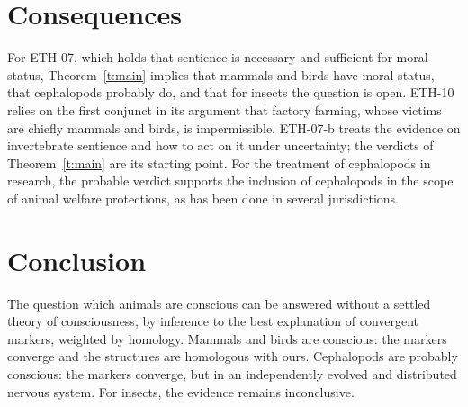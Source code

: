 \documentclass{situationist-preprint}
\begin{document}
\section{Consequences}

For ETH-07, which holds that sentience is necessary and sufficient for moral status, Theorem~\ref{t:main} implies that mammals and birds have moral status, that cephalopods probably do, and that for insects the question is open. ETH-10 relies on the first conjunct in its argument that factory farming, whose victims are chiefly mammals and birds, is impermissible. ETH-07-b treats the evidence on invertebrate sentience and how to act on it under uncertainty; the verdicts of Theorem~\ref{t:main} are its starting point. For the treatment of cephalopods in research, the probable verdict supports the inclusion of cephalopods in the scope of animal welfare protections, as has been done in several jurisdictions.

\section{Conclusion}

The question which animals are conscious can be answered without a settled theory of consciousness, by inference to the best explanation of convergent markers, weighted by homology. Mammals and birds are conscious: the markers converge and the structures are homologous with ours. Cephalopods are probably conscious: the markers converge, but in an independently evolved and distributed nervous system. For insects, the evidence remains inconclusive.
\end{document}
